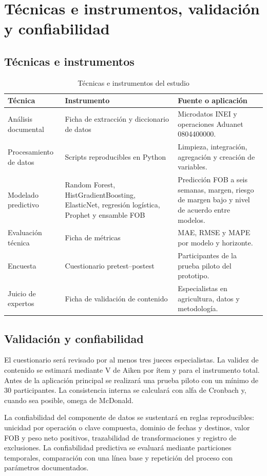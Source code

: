 \section{Técnicas e instrumentos, validación y confiabilidad}

\subsection{Técnicas e instrumentos}

\begin{table}[H]
\centering
\caption{Técnicas e instrumentos del estudio}
\small
\begin{tabularx}{\textwidth}{p{3.4cm}p{4.1cm}X}
\toprule
\textbf{Técnica} & \textbf{Instrumento} & \textbf{Fuente o aplicación} \\
\midrule
Análisis documental & Ficha de extracción y diccionario de datos & Microdatos INEI y operaciones Aduanet 0804400000. \\
Procesamiento de datos & Scripts reproducibles en Python & Limpieza, integración, agregación y creación de variables. \\
Modelado predictivo & Random Forest, HistGradientBoosting, ElasticNet, regresión logística, Prophet y ensamble FOB & Predicción FOB a seis semanas, margen, riesgo de margen bajo y nivel de acuerdo entre modelos. \\
Evaluación técnica & Ficha de métricas & MAE, RMSE y MAPE por modelo y horizonte. \\
Encuesta & Cuestionario pretest--postest & Participantes de la prueba piloto del prototipo. \\
Juicio de expertos & Ficha de validación de contenido & Especialistas en agricultura, datos y metodología. \\
\bottomrule
\end{tabularx}
\end{table}

\subsection{Validación y confiabilidad}

El cuestionario será revisado por al menos tres jueces especialistas. La validez de contenido se estimará mediante V de Aiken por ítem y para el instrumento total. Antes de la aplicación principal se realizará una prueba piloto con un mínimo de 30 participantes. La consistencia interna se calculará con alfa de Cronbach y, cuando sea posible, omega de McDonald.

La confiabilidad del componente de datos se sustentará en reglas reproducibles: unicidad por operación o clave compuesta, dominio de fechas y destinos, valor FOB y peso neto positivos, trazabilidad de transformaciones y registro de exclusiones. La confiabilidad predictiva se evaluará mediante particiones temporales, comparación con una línea base y repetición del proceso con parámetros documentados.
